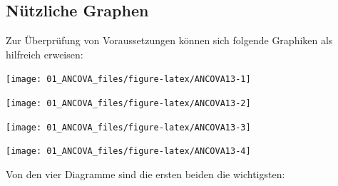 \documentclass[]{article}
\begin{document}
\subsection*{Nützliche Graphen}\label{nutzliche-graphen}

Zur Überprüfung von Voraussetzungen können sich folgende Graphiken als
hilfreich erweisen:

\begin{center}\texttt{[image: 01\_ANCOVA\_files/figure-latex/ANCOVA13-1]} \end{center}

\begin{center}\texttt{[image: 01\_ANCOVA\_files/figure-latex/ANCOVA13-2]} \end{center}

\begin{center}\texttt{[image: 01\_ANCOVA\_files/figure-latex/ANCOVA13-3]} \end{center}

\begin{center}\texttt{[image: 01\_ANCOVA\_files/figure-latex/ANCOVA13-4]} \end{center}

Von den vier Diagramme sind die ersten beiden die wichtigsten:
\end{document}
